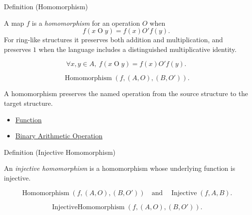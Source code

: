 \begin{definitionbox}{Definition (Homomorphism)}
\begin{definition}[Homomorphism]
\label{def:homomorphism}
A map $f$ is a \emph{homomorphism} for an operation $O$ when
\[
f(x\mathbin{O}y)=f(x)\mathbin{O'}f(y).
\]
For ring-like structures it preserves both addition and multiplication, and
preserves $1$ when the language includes a distinguished multiplicative
identity.
\end{definition}
\end{definitionbox}

\begin{remark*}
\[
\forall x,y\in A,\ f(x\mathbin{O}y)=f(x)\mathbin{O'}f(y).
\]
\end{remark*}

\begin{remark*}
\[
\operatorname{Homomorphism}(f,(A,O),(B,O')).
\]
\end{remark*}

\begin{remark*}[Interpretation]
A homomorphism preserves the named operation from the source structure to the
target structure.
\end{remark*}

\begin{dependencies}
\begin{itemize}
  \item \hyperref[def:function]{Function}
  \item \hyperref[def:binary-arithmetic-operation]{Binary Arithmetic Operation}
\end{itemize}
\end{dependencies}

\begin{definitionbox}{Definition (Injective Homomorphism)}
\begin{definition}
\label{def:injective-homomorphism}
An \emph{injective homomorphism} is a homomorphism whose underlying function
is injective.
\end{definition}
\end{definitionbox}

\begin{remark*}
\[
\operatorname{Homomorphism}(f,(A,O),(B,O'))
\quad\text{and}\quad
\operatorname{Injective}(f,A,B).
\]
\end{remark*}

\begin{remark*}
\[
\operatorname{InjectiveHomomorphism}(f,(A,O),(B,O')).
\]
\end{remark*}


